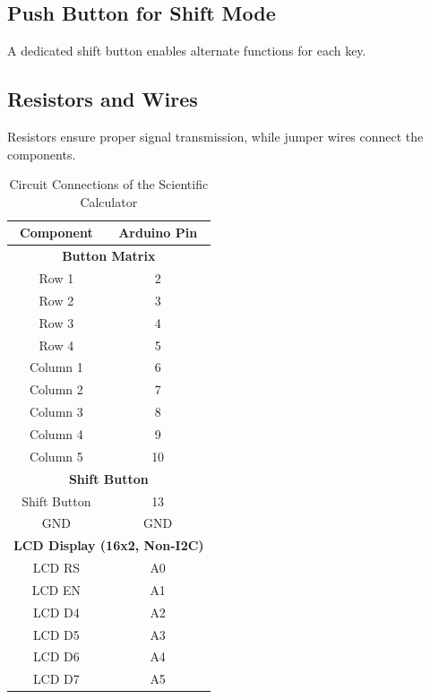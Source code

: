 \documentclass[a4paper,12pt]{article}
\begin{document}
\subsection{Push Button for Shift Mode}
A dedicated shift button enables alternate functions for each key.

\subsection{Resistors and Wires}
Resistors ensure proper signal transmission, while jumper wires connect the components.
\begin{table}[H]
    \centering
    \renewcommand{\arraystretch}{1.2} %
    \begin{tabular}{|c|c|}
        \hline
        \textbf{Component} & \textbf{Arduino Pin} \\
        \hline
        \multicolumn{2}{|c|}{\textbf{Button Matrix}} \\
        \hline
        Row 1 & 2 \\
        Row 2 & 3 \\
        Row 3 & 4 \\
        Row 4 & 5 \\
        Column 1 & 6 \\
        Column 2 & 7 \\
        Column 3 & 8 \\
        Column 4 & 9 \\
        Column 5 & 10 \\
        \hline
        \multicolumn{2}{|c|}{\textbf{Shift Button}} \\
        \hline
        Shift Button & 13 \\
        GND & GND \\
        \hline
        \multicolumn{2}{|c|}{\textbf{LCD Display (16x2, Non-I2C)}} \\
        \hline
        LCD RS & A0 \\
        LCD EN & A1 \\
        LCD D4 & A2 \\
        LCD D5 & A3 \\
        LCD D6 & A4 \\
        LCD D7 & A5 \\
        \hline
    \end{tabular}
    \caption{Circuit Connections of the Scientific Calculator}
    \label{tab:circuit_connections}
\end{table}
\newpage
\end{document}
